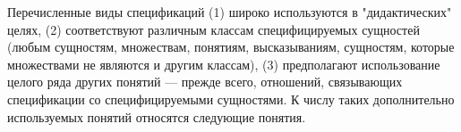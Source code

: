 Перечисленные виды спецификаций (1) широко используются в "дидактических"{} целях, (2) соответствуют различным классам специфицируемых сущностей (любым сущностям, множествам, понятиям, высказываниям, сущностям, которые множествами не являются и другим классам), (3) предполагают использование целого ряда других понятий --- прежде всего, отношений, связывающих спецификации со специфицируемыми сущностями. К числу таких дополнительно используемых понятий относятся следующие понятия.

\begin{SCn}
\end{SCn}

\begin{SCn}
\end{SCn}

\begin{SCn}
\end{SCn}

\begin{SCn}
\end{SCn}

\begin{SCn}
\end{SCn}

\begin{SCn}
\end{SCn}

\begin{SCn}
\end{SCn}

\begin{SCn}
\end{SCn}

\begin{SCn}
\end{SCn}

\begin{SCn}
\end{SCn}

